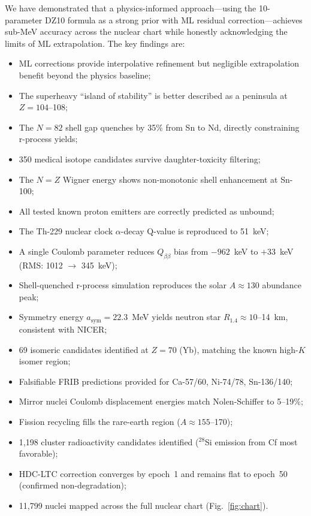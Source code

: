 \documentclass[twocolumn,letterpaper,10pt]{article}
\begin{document}
We have demonstrated that a physics-informed approach---using the
10-parameter DZ10 formula as a strong prior with ML residual
correction---achieves sub-MeV accuracy across the nuclear chart while
honestly acknowledging the limits of ML extrapolation. The key findings
are:
\begin{itemize}
\item ML corrections provide interpolative refinement but negligible
      extrapolation benefit beyond the physics baseline;
\item The superheavy ``island of stability'' is better described as a
      peninsula at $Z=104$--108;
\item The $N=82$ shell gap quenches by 35\% from Sn to Nd, directly
      constraining r-process yields;
\item 350 medical isotope candidates survive daughter-toxicity filtering;
\item The $N=Z$ Wigner energy shows non-monotonic shell enhancement at
      Sn-100;
\item All tested known proton emitters are correctly predicted as unbound;
\item The Th-229 nuclear clock $\alpha$-decay Q-value is reproduced to
      51~keV;
\item A single Coulomb parameter reduces $Q_{\beta\beta}$ bias from
      $-962$~keV to $+33$~keV (RMS: 1012 $\to$ 345~keV);
\item Shell-quenched r-process simulation reproduces the solar
      $A \approx 130$ abundance peak;
\item Symmetry energy $a_\text{sym} = 22.3$~MeV yields neutron star
      $R_{1.4} \approx 10$--14~km, consistent with NICER;
\item 69 isomeric candidates identified at $Z=70$ (Yb), matching the
      known high-$K$ isomer region;
\item Falsifiable FRIB predictions provided for Ca-57/60, Ni-74/78,
      Sn-136/140;
\item Mirror nuclei Coulomb displacement energies match Nolen-Schiffer
      to 5--19\%;
\item Fission recycling fills the rare-earth region ($A \approx 155$--170);
\item 1,198 cluster radioactivity candidates identified ($^{28}$Si
      emission from Cf most favorable);
\item HDC-LTC correction converges by epoch~1 and remains flat to
      epoch~50 (confirmed non-degradation);
\item 11,799 nuclei mapped across the full nuclear chart
      (Fig.~\ref{fig:chart}).
\end{itemize}
\end{document}
